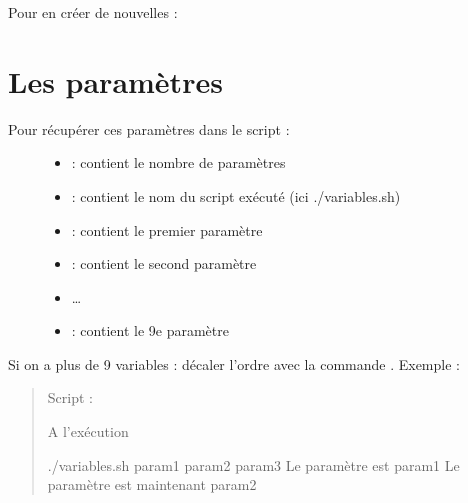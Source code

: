 \documentclass[letterpaper,10pt,french]{sphinxmanual}
\begin{document}
Pour en créer de nouvelles : 


\section{Les paramètres}
\label{\detokenize{21-scripts-shell:les-parametres}}
\begin{description}
\item[{Pour récupérer ces paramètres dans le script :}] \leavevmode\begin{itemize}
\item {} 
\sphinxcode{\sphinxupquote{\$\#}} : contient le nombre de paramètres

\item {} 
 : contient le nom du script exécuté (ici ./variables.sh)

\item {} 
 : contient le premier paramètre

\item {} 
 : contient le second paramètre

\item {} 
…

\item {} 
 : contient le 9e paramètre

\end{itemize}

\end{description}

Si on a plus de 9 variables : décaler l’ordre avec la commande  . Exemple :
\begin{quote}

Script :

%
\begin{sphinxVerbatim}[commandchars=\\\{\}]
 
 
\end{sphinxVerbatim}

A l’exécution

%
\begin{sphinxVerbatim}[commandchars=\\\{\}]
\PYGZdl{} ./variables.sh param1 param2 param3
Le paramètre  est param1
Le paramètre  est maintenant param2
\end{sphinxVerbatim}
\end{quote}
\end{document}

